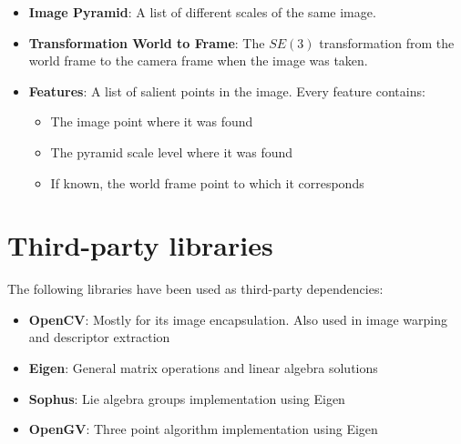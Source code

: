 \begin{itemize}
  \item \textbf{Image Pyramid}: A list of different scales of the same image.
  \item \textbf{Transformation World to Frame}: The $SE(3)$ transformation from the world frame to the camera frame when the image was taken.
  \item \textbf{Features}: A list of salient points in the image. Every feature contains:
    \begin{itemize}
      \item The image point where it was found
      \item The pyramid scale level where it was found
      \item If known, the world frame point to which it corresponds
    \end{itemize}
\end{itemize}

\section{Third-party libraries}
\label{sec:third_party_libraries}

The following libraries have been used as third-party dependencies:

\begin{itemize}
  \item \textbf{OpenCV}\cite{opencv_library}: Mostly for its image encapsulation. Also used in image warping and descriptor extraction

  \item \textbf{Eigen}\cite{eigenweb}: General matrix operations and linear algebra solutions

  \item \textbf{Sophus}\cite{sophus}: Lie algebra groups implementation using Eigen

  \item \textbf{OpenGV}\cite{kneipopengv}: Three point algorithm implementation using Eigen
\end{itemize}

